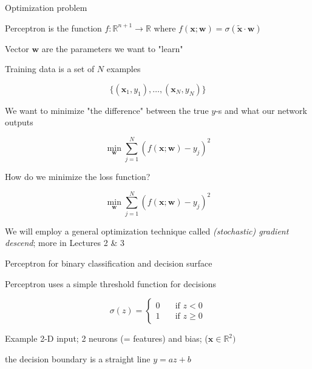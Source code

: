 \documentclass[12pt]{beamer}
\begin{document}
\begin{frame}{Optimization problem}
	
Perceptron is the function $f : \mathbb{R}^{n+1} \to \mathbb{R}$ where $f(\mathbf{x}; \mathbf{w}) = \sigma (\tilde{\mathbf{x}} \cdot \mathbf{w})$

Vector $\mathbf{w}$ are the parameters we want to "learn"

Training data is a set of $N$ examples

$$\{(\mathbf{x}_1, y_1),  \dots, (\mathbf{x}_N, y_N) \}$$

We want to minimize "the difference" between the true $y$-s and what our network outputs

$$
\min_{\mathbf{w}} \sum_{j = 1}^{N} (f(\mathbf{x}; \mathbf{w}) - y_j )^2
$$
	
	
\end{frame}


\begin{frame}{How do we minimize the loss function?}
	
$$
\min_{\mathbf{w}} \sum_{j = 1}^{N} (f(\mathbf{x}; \mathbf{w}) - y_j )^2
$$

We will employ a general optimization technique called \emph{(stochastic) gradient descend}; more in Lectures 2 \& 3


	
\end{frame}


\begin{frame}{Perceptron for binary classification and decision surface}
	

Perceptron uses a simple threshold function for decisions

$$
\sigma(z) =
\begin{cases}
0  & \quad \text{if } z < 0\\
1  & \quad \text{if } z \geq 0
\end{cases}
$$

Example 2-D input; 2 neurons (= features) and bias; ($\mathbf{x} \in \mathbb{R}^2)$

the decision boundary is a straight line $y = az + b$

	
\end{frame}
\end{document}
